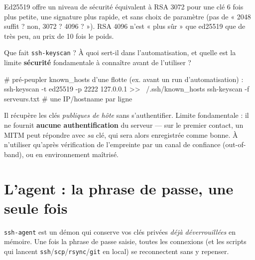 \documentclass[a4paper,10pt]{exam}
\begin{document}
\begin{questions}
\begin{solution}
\begin{bashcode}
\end{bashcode}
Ed25519 offre un niveau de sécurité équivalent à RSA 3072 pour une clé 6 fois plus
petite, une signature plus rapide, et sans choix de paramètre (pas de « 2048 suffit ?
non, 3072 ? 4096 ? »). RSA 4096 n'est « plus sûr » que ed25519 que de très peu, au prix
de 10 fois le poids.
\end{solution}
\question Que fait \texttt{ssh-keyscan} ? À quoi sert-il dans l'automatisation, et quelle
est la limite \textbf{sécurité} fondamentale à connaître avant de l'utiliser ?
\begin{solution}
\begin{bashcode}
# pré-peupler known_hosts d'une flotte (ex. avant un run d'automatisation) :
ssh-keyscan -t ed25519 -p 2222 127.0.0.1 >> ~/.ssh/known_hosts
ssh-keyscan -f serveurs.txt          # une IP/hostname par ligne
\end{bashcode}
Il récupère les clés \emph{publiques de hôte} sans s'authentifier. Limite fondamentale :
il ne fournit \textbf{aucune authentification} du serveur — sur le premier contact, un
MITM peut répondre avec \emph{sa} clé, qui sera alors enregistrée comme bonne.
À n'utiliser qu'après vérification de l'empreinte par un canal de confiance
(out-of-band), ou en environnement maîtrisé.
\end{solution}
\end{questions}

\section{L'agent : la phrase de passe, une seule fois}

\texttt{ssh-agent} est un démon qui conserve vos clés privées \emph{déjà déverrouillées} en
mémoire. Une fois la phrase de passe saisie, toutes les connexions (et les scripts qui
lancent \texttt{ssh}/\texttt{scp}/\texttt{rsync}/\texttt{git} en local) se reconnectent sans
y repenser.
\end{document}
